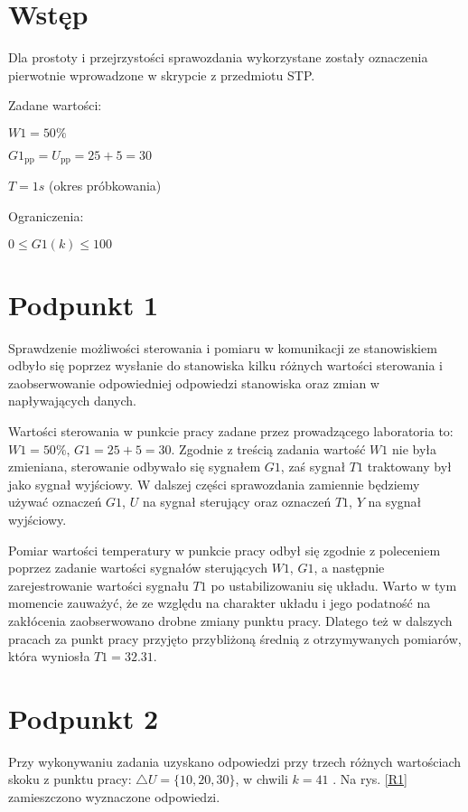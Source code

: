 \chapter{Wstęp}
Dla prostoty i przejrzystości sprawozdania wykorzystane zostały oznaczenia pierwotnie wprowadzone w skrypcie z przedmiotu STP.

\bigskip

Zadane wartości:

\smallskip

$W1=50\%$

\smallskip

$G1_{\mathrm{pp}}=U_{\mathrm{pp}}=25+5=30$

\smallskip

$T=1s$ (okres próbkowania)

\bigskip

Ograniczenia:

\smallskip

$0 \le G1(k) \le 100$

\chapter{Podpunkt 1}
Sprawdzenie możliwości sterowania i pomiaru w komunikacji ze stanowiskiem odbyło się poprzez wysłanie do stanowiska kilku różnych wartości sterowania i zaobserwowanie odpowiedniej odpowiedzi stanowiska oraz zmian w napływających danych.

Wartości sterowania w punkcie pracy zadane przez prowadzącego laboratoria to: $W1=50\%$, $G1=25+5=30$. Zgodnie z treścią zadania wartość $W1$ nie była zmieniana, sterowanie odbywało się sygnałem $G1$, zaś sygnał $T1$ traktowany był jako sygnał wyjściowy. W dalszej części sprawozdania zamiennie będziemy używać oznaczeń $G1$, $U$ na sygnał sterujący oraz oznaczeń $T1$, $Y$ na sygnał wyjściowy.

Pomiar wartości temperatury w punkcie pracy odbył się zgodnie z poleceniem poprzez zadanie wartości sygnałów sterujących $W1$, $G1$, a następnie zarejestrowanie wartości sygnału $T1$ po ustabilizowaniu się układu. Warto w tym momencie zauważyć, że ze względu na charakter układu i jego podatność na zakłócenia zaobserwowano drobne zmiany punktu pracy. Dlatego też w dalszych pracach za punkt pracy przyjęto przybliżoną średnią z otrzymywanych pomiarów, która wyniosła $T1=\num{32,31}$.


\chapter{Podpunkt 2}
Przy wykonywaniu zadania uzyskano odpowiedzi przy trzech różnych wartościach skoku z punktu pracy: $\triangle U = \{10, 20, 30\}$, w chwili $k=\num{41}$ . Na rys. \ref{R1} zamieszczono wyznaczone odpowiedzi.

